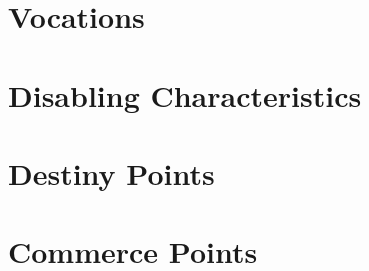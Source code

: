 \newpage
\chapter{Vocations} \label{ch:cc_vocations}


\newpage
\chapter{Disabling Characteristics} \label{ch:cc_disabling_characteristics}


\newpage
\chapter{Destiny Points} \label{ch:cc_destiny_points}


\newpage
\chapter{Commerce Points} \label{ch:cc_commerce_points}


%
%

%


